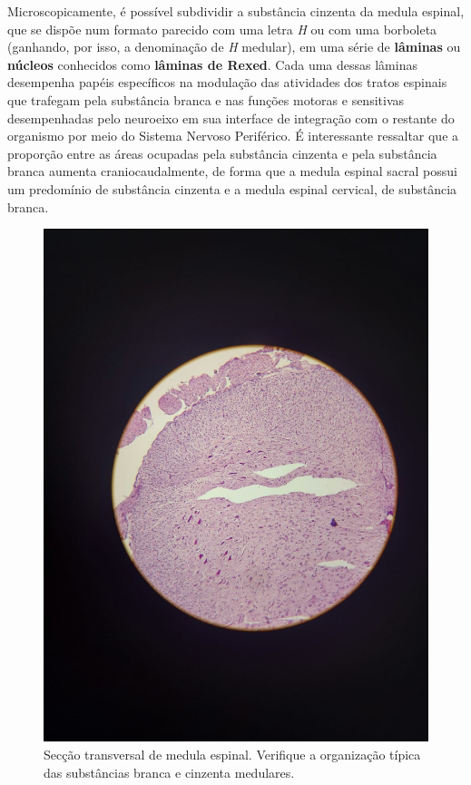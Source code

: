 \documentclass[
]{book}
\begin{document}
Microscopicamente, é possível subdividir a substância cinzenta da medula espinal, que se dispõe num formato parecido com uma letra \emph{H} ou com uma borboleta (ganhando, por isso, a denominação de \emph{H} medular), em uma série de \textbf{lâminas} ou \textbf{núcleos} conhecidos como \textbf{lâminas de Rexed}. Cada uma dessas lâminas desempenha papéis específicos na modulação das atividades dos tratos espinais que trafegam pela substância branca e nas funções motoras e sensitivas desempenhadas pelo neuroeixo em sua interface de integração com o restante do organismo por meio do Sistema Nervoso Periférico. É interessante ressaltar que a proporção entre as áreas ocupadas pela substância cinzenta e pela substância branca aumenta craniocaudalmente, de forma que a medula espinal sacral possui um predomínio de substância cinzenta e a medula espinal cervical, de substância branca.

\begin{figure}
\centering
\includegraphics{images/neuro-medula.jpeg}
\caption{\label{fig:unnamed-chunk-6}Secção transversal de medula espinal. Verifique a organização típica das substâncias branca e cinzenta medulares.}
\end{figure}
\end{document}
